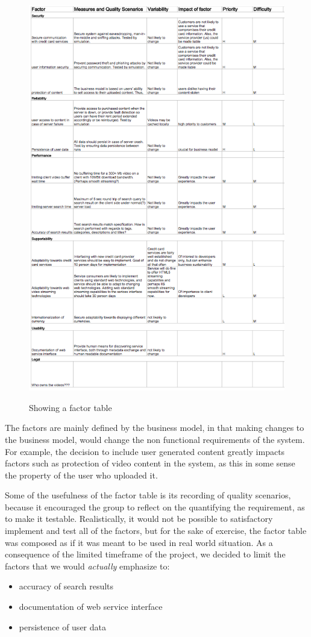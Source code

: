 \begin{figure}[H]
\centering
\includegraphics[scale=1.0]{FactorTable.png}
\label{factortable}
\caption{Showing a factor table}
\end{figure}

The factors are mainly defined by the business model, in that making changes to the business model, would change the non functional requirements of the system.  For example, the decision to include user generated content greatly impacts factors such as protection of video content in the system, as this in some sense the property of the user who uploaded it.

Some of the usefulness of the factor table is its recording of quality scenarios, because it encouraged the group to reflect on the quantifying the requirement, as to make it testable. Realistically, it would not be possible to satisfactory implement and test all of the factors, but for the sake of exercise, the factor table was composed as if it was meant to be used in  real world situation. As a consequence of the limited timeframe of the project, we decided to limit the factors that we would \textit{actually} emphasize to:
\begin{itemize}
\item accuracy of search results
\item documentation of web service interface
\item persistence of user data
\end{itemize}

